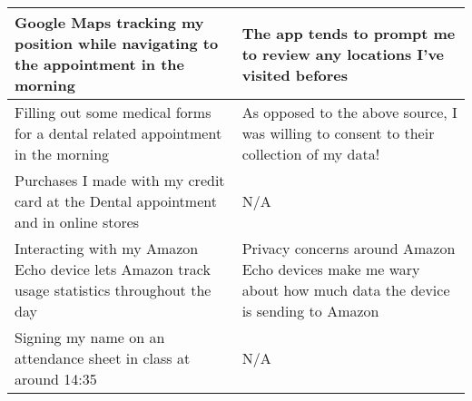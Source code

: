 \documentclass[
  coursecode={CMPE 251},
  assignmentname={Exercise 1},
  studentnumber=20053722,
  name={Bryan Hoang}
]{
  ltxanswer%
}
\begin{document}
\begin{questions}
\begin{solution}
\begin{center}
\begin{tabularx}{\textwidth}{
            >{\raggedright\arraybackslash}X
            >{\raggedright\arraybackslash}X}
          \midrule
          Google Maps tracking my position while navigating to the appointment in the morning                                                             & The app tends to prompt me to review any locations I've visited befores                                                                                                                                                                                                                                                                                                               \\
          \midrule
          Filling out some medical forms for a dental related appointment in the morning                                                                  & As opposed to the above source, I was willing to consent to their collection of my data!                                                                                                                                                                                                                                                                                              \\
          \midrule
          Purchases I made with my credit card at the Dental appointment and in online stores                                                             & N/A                                                                                                                                                                                                                                                                                                                                                                                   \\
          \midrule
          Interacting with my Amazon Echo device lets Amazon track usage statistics throughout the day                                                    & Privacy concerns around Amazon Echo devices make me wary about how much data the device is sending to Amazon                                                                                                                                                                                                                                                                          \\
          \midrule
          Signing my name on an attendance sheet in class at around \textapprox{}14:35                                                                    & N/A                                                                                                                                                                                                                                                                                                                                                                                   \\

\end{tabularx}
\end{center}
\end{solution}
\end{questions}
\end{document}
